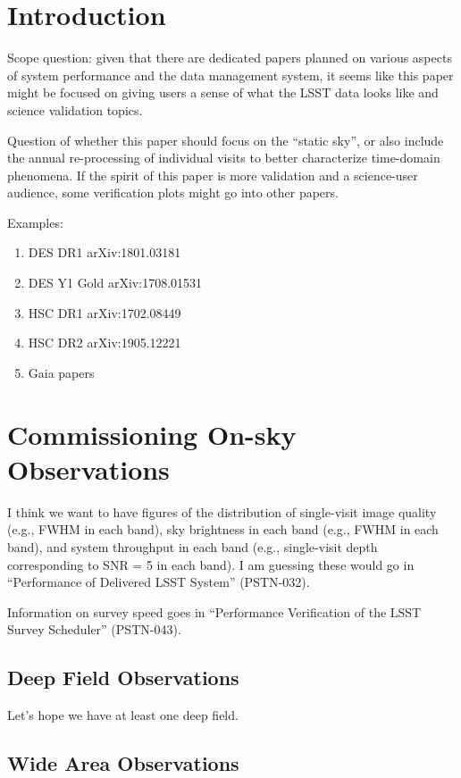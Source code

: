 \section{Introduction}


Scope question: given that there are dedicated papers planned on various aspects of system performance and the data management system, it seems like this paper might be focused on giving users a sense of what the LSST data looks like and science validation topics. 

Question of whether this paper should focus on the ``static sky'', or also include the annual re-processing of individual visits to better characterize time-domain phenomena.
If the spirit of this paper is more validation and a science-user audience, some verification plots might go into other papers.

Examples:

\begin{enumerate}
\item DES DR1 arXiv:1801.03181
\item DES Y1 Gold arXiv:1708.01531
\item HSC DR1 arXiv:1702.08449
\item HSC DR2 arXiv:1905.12221
\item Gaia papers
\end{enumerate}

\section{Commissioning On-sky Observations}

I think we want to have figures of the distribution of single-visit image quality (e.g., FWHM in each band), sky brightness in each band (e.g., FWHM in each band), and system throughput in each band (e.g., single-visit depth corresponding to SNR = 5 in each band). I am guessing these would go in ``Performance of Delivered LSST System'' (PSTN-032).

Information on survey speed goes in ``Performance Verification of the LSST Survey Scheduler'' (PSTN-043).

\subsection{Deep Field Observations}

Let's hope we have at least one deep field.

\subsection{Wide Area Observations}

